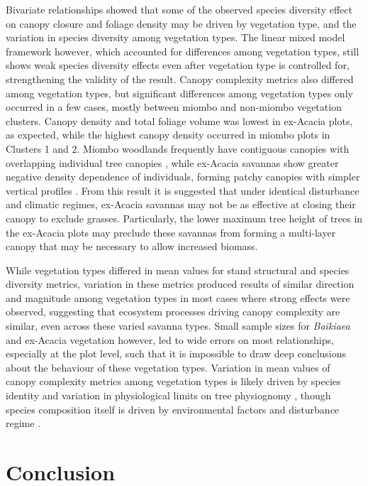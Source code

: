 \begin{refsection}
Bivariate relationships showed that some of the observed species diversity effect on canopy closure and foliage density may be driven by vegetation type, and the variation in species diversity among vegetation types. The linear mixed model framework however, which accounted for differences among vegetation types, still shows weak species diversity effects even after vegetation type is controlled for, strengthening the validity of the result. Canopy complexity metrics also differed among vegetation types, but significant differences among vegetation types only occurred in a few cases, mostly between miombo and non-miombo vegetation clusters. Canopy density and total foliage volume was lowest in ex-Acacia plots, as expected, while the highest canopy density occurred in miombo plots in Clusters 1 and 2. Miombo woodlands frequently have contiguous canopies with overlapping individual tree canopies \citep{Solbrig1996}, while ex-Acacia savannas show greater negative density dependence of individuals, forming patchy canopies with simpler vertical profiles \citep{Pillay2012}. From this result it is suggested that under identical disturbance and climatic regimes, ex-Acacia savannas may not be as effective at closing their canopy to exclude grasses. Particularly, the lower maximum tree height of trees in the ex-Acacia plots may preclude these savannas from forming a multi-layer canopy that may be necessary to allow increased biomass.

While vegetation types differed in mean values for stand structural and species diversity metrics, variation in these metrics produced results of similar direction and magnitude among vegetation types in most cases where strong effects were observed, suggesting that ecosystem processes driving canopy complexity are similar, even across these varied savanna types. Small sample sizes for \textit{Baikiaea} and ex-Acacia vegetation however, led to wide errors on most relationships, especially at the plot level, such that it is impossible to draw deep conclusions about the behaviour of these vegetation types. Variation in mean values of canopy complexity metrics among vegetation types is likely driven by species identity and variation in physiological limits on tree physiognomy \citep{Seidel2013, Sercu2017}, though species composition itself is driven by environmental factors and disturbance regime \citep{Ribeiro2020}. 

\section{Conclusion}
\label{tls:sec:conclusion}


\end{refsection}
